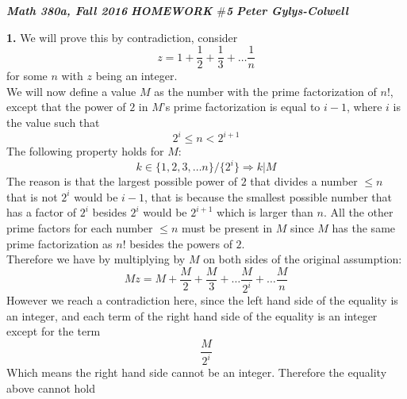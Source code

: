 \documentclass[12pt]{article}
\newenvironment{ques}{\vspace{2 ex}}{\vspace{2 ex}}
\theoremstyle{definition}
\begin{document}
\noindent \textit{\textbf{Math 380a, Fall 2016}} \hspace{1.3cm}
\textit{\textbf{HOMEWORK $\#$5}} \hspace{1.3cm} \textit{\textbf{Peter
Gylys-Colwell}} 

\vspace{1cm}

\begin{ques}
	\textbf{1.} We will prove this by contradiction, consider 
		$$z = 1 + \frac12 + \frac13 + \dots \frac1n$$
		for some $n$ with $z$ being an integer.\\
		We will now define a value $M$ as the number with the prime
		factorization of $n!$, except that the power of
		$2$ in $M$'s prime factorization is equal to $i - 1$, where $i$ is
		the value such that
		$$2^i \leq n < 2^{i+1}$$
		The following property holds for $M$:
		$$k \in \{1, 2, 3, \dots n\} / \{2^i\} \Rightarrow k|M$$
		The reason is that the largest possible power of $2$ that
		divides a number $\leq n$ that is not $2^i$ would be $i - 1$,
		that is because the smallest possible number that has a factor
		of $2^i$ besides $2^i$ would be $2^{i + 1}$ which is larger
		than $n$. All the other prime factors for each number $\leq n$
		must be present in $M$ since $M$ has the same prime
		factorization as $n!$ besides the powers of $2$.\\
		Therefore we have by multiplying by $M$ on both sides of the
		original assumption:
		$$Mz = M + \frac M 2 + \frac M 3 + \dots \frac M {2^i} + \dots
		\frac M n$$
		However we reach a contradiction here, since the left hand
		side of the equality is an integer, and each term of the right
		hand side of the equality is an integer except for the term 
		$$\frac M {2^i}$$
		Which means the right hand side cannot be an integer. Therefore
		the equality above cannot hold

\end{ques}
\end{document}
